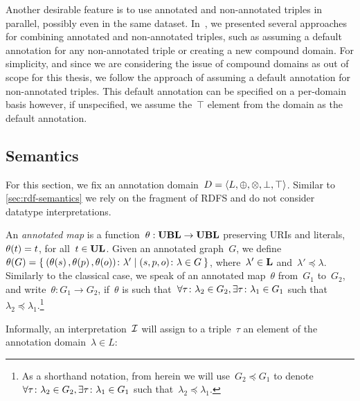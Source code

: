 Another desirable feature is to use annotated and non-annotated triples in parallel, possibly even in the same dataset.
In~\citet{ZimmermannLopesPolleres:2012aa}, we presented several approaches for combining annotated and non-annotated
triples, such as assuming a default annotation for any non-annotated triple or creating a new compound domain.
% 
For simplicity, and since we are considering the issue of compound domains as out of scope for this thesis, we follow
the approach of assuming a default annotation for non-annotated triples. 
%
This default annotation can be specified on a per-domain basis however, if unspecified, we assume the~$\top$ element
from the domain as the default annotation.





\subsection{Semantics}
\label{sec:anql-semantics}
%
For this section, we fix an annotation domain~$D = \langle L, \oplus, \otimes, \bot, \top \rangle$.
%
Similar to \cref{sec:rdf-semantics} we rely on the \rhodf fragment of \ac{RDFS} and do not consider datatype
interpretations.
%
\begin{definition}
  An \emph{annotated map} is a function~$\theta : \mathbf{UBL} \to \mathbf{UBL}$ preserving \acp{URI} and literals,
  \ie~$\mathit{\theta}\!\left(t\right) = t$, for all~$t \in \mathbf{UL}$.
  Given an annotated graph~$G$, we define~$\mathit{\theta}\!\left(G\right) = \left\{\: \mbox{$(\mathit{\theta}\!\left(s\right), \mathit{\theta}\!\left(p\right),
        \mathit{\theta}\!\left(o\right))\colon\lambda'$} \mid \mbox{$(s, p, o)\colon\lambda$} \in G \:\right\}$, where~$\lambda' \in \mathbf{L}$
  and~$\lambda' \preceq \lambda$.
  Similarly to the classical case, we speak of an annotated map~$\theta$ from~$G_{1}$ to~$G_{2}$, and write~$\theta :
  G_{1} \to G_{2}$, if~$\theta$ is such that~$\forall \mbox{$\tau\colon\lambda_{2}$} \in G_{2},
  \exists\mbox{$\tau\colon\lambda_{1}$} \in G_{1}$ such that~$\lambda_{2} \preceq \lambda_{1}$.\footnote{As a shorthand
    notation, from herein we will use~$G_{2} \preceq G_{1}$ to denote~$\forall \mbox{$\tau\colon\lambda_{2}$} \in G_{2},
    \exists\mbox{$\tau\colon\lambda_{1}$} \in G_{1}$ such that~$\lambda_{2} \preceq \lambda_{1}$.}
\end{definition}
%
Informally, an interpretation~$\mathcal{I}$ will assign to a triple~$\tau$ an element of the annotation domain~$\lambda \in L$:
%
